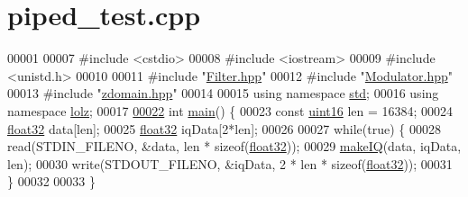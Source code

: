 \hypertarget{piped__test_8cpp_source}{\section{piped\+\_\+test.\+cpp}
\label{piped__test_8cpp_source}
}

\begin{DoxyCode}
00001 
00007 \textcolor{preprocessor}{#include <cstdio>}
00008 \textcolor{preprocessor}{#include <iostream>}
00009 \textcolor{preprocessor}{#include <unistd.h>}
00010 
00011 \textcolor{preprocessor}{#include "\hyperlink{Filter_8hpp}{Filter.hpp}"}
00012 \textcolor{preprocessor}{#include "\hyperlink{Modulator_8hpp}{Modulator.hpp}"}
00013 \textcolor{preprocessor}{#include "\hyperlink{zdomain_8hpp}{zdomain.hpp}"}
00014 
00015 \textcolor{keyword}{using namespace }\hyperlink{namespacestd}{std};
00016 \textcolor{keyword}{using namespace }\hyperlink{namespacelolz}{lolz};
00017 
\hypertarget{piped__test_8cpp_source_l00022}{}\hyperlink{piped__test_8cpp_ae66f6b31b5ad750f1fe042a706a4e3d4}{00022} \textcolor{keywordtype}{int} \hyperlink{piped__test_8cpp_ae66f6b31b5ad750f1fe042a706a4e3d4}{main}() \{
00023     \textcolor{keyword}{const} \hyperlink{definitions_8hpp_a05f6b0ae8f6a6e135b0e290c25fe0e4e}{uint16} len = 16384;
00024     \hyperlink{definitions_8hpp_aacdc525d6f7bddb3ae95d5c311bd06a1}{float32} data[len];
00025     \hyperlink{definitions_8hpp_aacdc525d6f7bddb3ae95d5c311bd06a1}{float32} iqData[2*len];
00026 
00027     \textcolor{keywordflow}{while}(\textcolor{keyword}{true}) \{
00028         read(STDIN\_FILENO, &data, len * \textcolor{keyword}{sizeof}(\hyperlink{definitions_8hpp_aacdc525d6f7bddb3ae95d5c311bd06a1}{float32}));
00029         \hyperlink{namespaceradio_a7166522e76ff88e8d482491b1b6e2275}{makeIQ}(data, iqData, len);
00030         write(STDOUT\_FILENO, &iqData,  2 * len * \textcolor{keyword}{sizeof}(\hyperlink{definitions_8hpp_aacdc525d6f7bddb3ae95d5c311bd06a1}{float32}));
00031     \}
00032 
00033 \}
\end{DoxyCode}
